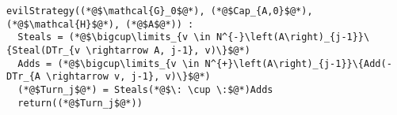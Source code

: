 {}
\begin{lstlisting}[label=evilstrategy, style=numbers]
evilStrategy((*@$\mathcal{G}_0$@*), (*@$Cap_{A,0}$@*), (*@$\mathcal{H}$@*), (*@$A$@*)) :
  Steals = (*@$\bigcup\limits_{v \in N^{-}\left(A\right)_{j-1}}\{Steal(DTr_{v \rightarrow A, j-1}, v)\}$@*)
  Adds = (*@$\bigcup\limits_{v \in N^{+}\left(A\right)_{j-1}}\{Add(-DTr_{A \rightarrow v, j-1}, v)\}$@*)
  (*@$Turn_j$@*) = Steals(*@$\: \cup \:$@*)Adds
  return((*@$Turn_j$@*))
\end{lstlisting}
